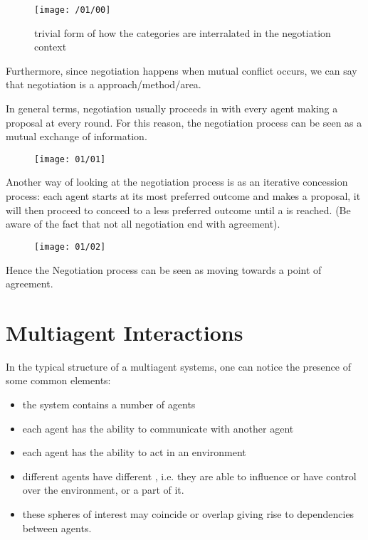 \begin{figure}[!h]
\centering
\texttt{[image: /01/00]}
\caption{trivial form of how the categories are interralated in the negotiation context}
\end{figure}

Furthermore, since negotiation happens when mutual conflict occurs, we can say that negotiation is a  approach/method/area.

In general terms, negotiation usually proceeds in   with every agent making a proposal at every round.
For this reason, the negotiation process can be seen as a mutual exchange of information.

\begin{figure}[!h]
\centering
\texttt{[image: 01/01]}
\end{figure}

Another way of looking at the negotiation process is as an iterative concession process: each agent starts at its most preferred outcome and makes a proposal, it will then proceed to conceed to a less preferred outcome until a  is reached. (Be aware of the fact that not all negotiation end with agreement).

\begin{figure}[!h]
\centering
\texttt{[image: 01/02]}
\end{figure}

Hence the Negotiation process can be seen as moving towards a point of agreement.

\section{Multiagent Interactions}
	In the typical structure of a multiagent systems, one can notice the presence of some common elements:
	\begin{itemize}
	\item the system contains a number of agents
	\item each agent has the ability to communicate with another agent
	\item each agent has the ability to act in an environment
	\item different agents have different , i.e. they are able to influence or have control over the environment, or a part of it.
	\item these spheres of interest may coincide or overlap giving rise to dependencies between agents.
	\end{itemize}	
	
